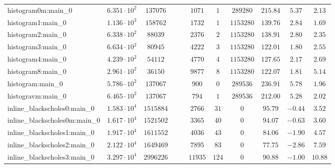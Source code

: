 \begin{tabular}{|l|c|c|c|c|c|c|c|c|c|c|}
histogram0m:main\_0            & $ 6.351 \cdot 10^{2} $ & $ 137076   $ & $  $ & $    $ & $ 1071   $ & $ 1    $ & $ 289280   $ & $ 215.84      $ & $ 5.37    $ & $ 2.13    $ \\
histogram1:main\_0             & $ 1.136 \cdot 10^{3} $ & $ 158762   $ & $  $ & $    $ & $ 1732   $ & $ 1    $ & $ 1153280  $ & $ 139.76      $ & $ 2.84    $ & $ 1.69    $ \\
histogram2:main\_0             & $ 6.338 \cdot 10^{2} $ & $ 88039    $ & $  $ & $    $ & $ 2376   $ & $ 2    $ & $ 1153280  $ & $ 138.91      $ & $ 2.80    $ & $ 2.35    $ \\
histogram3:main\_0             & $ 6.634 \cdot 10^{2} $ & $ 80945    $ & $  $ & $    $ & $ 4222   $ & $ 3    $ & $ 1153280  $ & $ 122.01      $ & $ 1.80    $ & $ 2.55    $ \\
histogram4:main\_0             & $ 4.239 \cdot 10^{2} $ & $ 54112    $ & $  $ & $    $ & $ 4770   $ & $ 4    $ & $ 1153280  $ & $ 127.65      $ & $ 2.17    $ & $ 2.69    $ \\
histogram8:main\_0             & $ 2.961 \cdot 10^{2} $ & $ 36150    $ & $  $ & $    $ & $ 9877   $ & $ 8    $ & $ 1153280  $ & $ 122.07      $ & $ 1.81    $ & $ 5.14    $ \\
histogram:main\_0              & $ 5.786 \cdot 10^{2} $ & $ 137067   $ & $  $ & $    $ & $ 900    $ & $ 0    $ & $ 289536   $ & $ 236.91      $ & $ 5.78    $ & $ 1.96    $ \\
histogravm:main\_0             & $ 6.465 \cdot 10^{2} $ & $ 137067   $ & $  $ & $    $ & $ 794    $ & $ 1    $ & $ 289536   $ & $ 212.00      $ & $ 5.28    $ & $ 2.02    $ \\
inline\_blackscholes0:main\_0  & $ 1.583 \cdot 10^{4} $ & $ 1515884  $ & $  $ & $    $ & $ 2766   $ & $ 31   $ & $ 0        $ & $ 95.79       $ & $ -0.44   $ & $ 3.52    $ \\
inline\_blackscholes0m:main\_0 & $ 1.617 \cdot 10^{4} $ & $ 1521502  $ & $  $ & $    $ & $ 3365   $ & $ 40   $ & $ 0        $ & $ 94.07       $ & $ -0.63   $ & $ 3.60    $ \\
inline\_blackscholes1:main\_0  & $ 1.917 \cdot 10^{4} $ & $ 1611552  $ & $  $ & $    $ & $ 4036   $ & $ 43   $ & $ 0        $ & $ 84.06       $ & $ -1.90   $ & $ 4.57    $ \\
inline\_blackscholes2:main\_0  & $ 2.122 \cdot 10^{4} $ & $ 1649469  $ & $  $ & $    $ & $ 7895   $ & $ 83   $ & $ 0        $ & $ 77.75       $ & $ -2.86   $ & $ 7.59    $ \\
inline\_blackscholes3:main\_0  & $ 3.297 \cdot 10^{4} $ & $ 2996226  $ & $  $ & $    $ & $ 11935  $ & $ 124  $ & $ 0        $ & $ 90.88       $ & $ -1.00   $ & $ 10.88   $ \\

\end{tabular}
